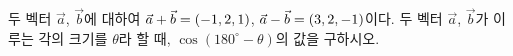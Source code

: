 두 벡터 $\vec{a}$, $\vec{b}$에 대하여 $\vec{a}+\vec{b}=(-1{,}\mkern3mu\mathopen{}2{,}\mkern3mu\mathopen{}1)$, $\vec{a}-\vec{b}=(3{,}\mkern3mu\mathopen{}2{,}\mkern3mu\mathopen{}-1)$이다. 두 벡터 $\vec{a}$, $\vec{b}$가 이루는 각의 크기를 $\theta$라 할 때, $\cos(180^\circ-\theta)$의 값을 구하시오.
